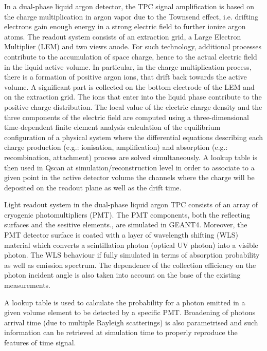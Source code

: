 
In a dual-phase liquid argon detector, the TPC signal amplification 
is based on the charge multiplication in argon vapor due to the Townsend effect, 
i.e. drifting electrons gain enough energy in a strong electric field to further ionize argon atoms. 
The readout system consists of an extraction grid, a Large Electron Multiplier (LEM) and two views anode.
For such technology, additional processes contribute to the
accumulation of space charge, hence to the actual electric field in the liquid active volume.
In particular, in the charge multiplication process, there is a formation of positive argon ions, 
that drift back towards the active volume. 
A significant part is collected on the bottom electrode of the LEM and on the extraction grid. 
The ions that enter into the liquid phase contribute to the positive charge distribution.
The local value of the electric charge density and the three components of the electric field
are computed using a three-dimensional time-dependent finite element analysis calculation of the equilibrium 
configuration of a physical system where the differential equations describing each charge production (e.g.: ionisation, amplification) and
absorption (e.g.: recombination, attachment) process are solved simultaneously. 
A lookup table is then used in Qscan at simulation/reconstruction level in order to associate to a given point in the active
detector volume the channels where the charge will be deposited on the readout plane as well as the drift time.

Light readout system in the dual-phase liquid argon TPC consists of an array of cryogenic photomultipliers (PMT).
The PMT components, both the reflecting surfaces and the sesitive elements., are simulated in GEANT4.
Moreover, the PMT detector surface is coated with a layer of wavelength shifting (WLS) material which converts a
scintillation photon (optical UV photon) into a visible photon. The WLS behaviour if fully simulated in
terms of absorption probability as well as emission spectrum.
The dependence of the collection efficiency on the photon incident angle is also taken into account on the base
of the existing measurements.  

A lookup table is used to calculate the probability for a photon emitted in a
given volume element to be detected by a specific PMT.
Broadening of photons arrival time (due to multiple Rayleigh scatterings)
is also parametrised and such information can be retrieved at simulation time
to properly reproduce the features of time signal.

